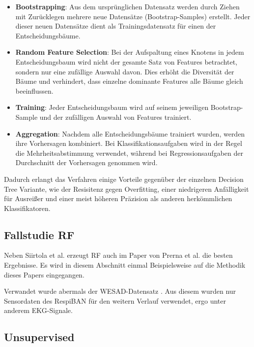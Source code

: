 \begin{itemize}
    \item \textbf{Bootstrapping}: Aus dem ursprünglichen Datensatz werden durch Ziehen mit Zurücklegen mehrere neue Datensätze (Bootstrap-Samples) erstellt. Jeder dieser neuen Datensätze dient als Trainingsdatensatz für einen der Entscheidungsbäume.
    
    \item \textbf{Random Feature Selection}: Bei der Aufspaltung eines Knotens in jedem Entscheidungsbaum wird nicht der gesamte Satz von Features betrachtet, sondern nur eine zufällige Auswahl davon. Dies erhöht die Diversität der Bäume und verhindert, dass einzelne dominante Features alle Bäume gleich beeinflussen.
    
    \item \textbf{Training}: Jeder Entscheidungsbaum wird auf seinem jeweiligen Bootstrap-Sample und der zufälligen Auswahl von Features trainiert.
    
    \item \textbf{Aggregation}: Nachdem alle Entscheidungsbäume trainiert wurden, werden ihre Vorhersagen kombiniert. Bei Klassifikationsaufgaben wird in der Regel die Mehrheitsabstimmung verwendet, während bei Regressionsaufgaben der Durchschnitt der Vorhersagen genommen wird.
\end{itemize}

Dadurch erlangt das Verfahren einige Vorteile gegenüber der einzelnen Decision Tree Variante, wie der Resisitenz gegen Overfitting, einer niedrigeren Anfälligkeit für Ausreißer und einer meist
höheren Präzision als anderen herkömmlichen Klassifikatoren.

\subsection{Fallstudie RF}

Neben Siirtola et al. \cite{Siirtola2019} erzeugt \ac{RF} auch im Paper von Prerna et al. \cite{Prerna2021} die besten Ergebnisse. Es wird in diesem Abschnitt einmal Beispielsweise auf die Methodik dieses Papers eingegangen.

Verwandet wurde abermals der WESAD-Datensatz \cite{Schmidt2018WESAD}. Aus diesem wurden nur Sensordaten des RespiBAN für den weitern Verlauf verwendet, ergo unter anderem 
\ac{EKG}-Signale. 



\subsection{Unsupervised}

